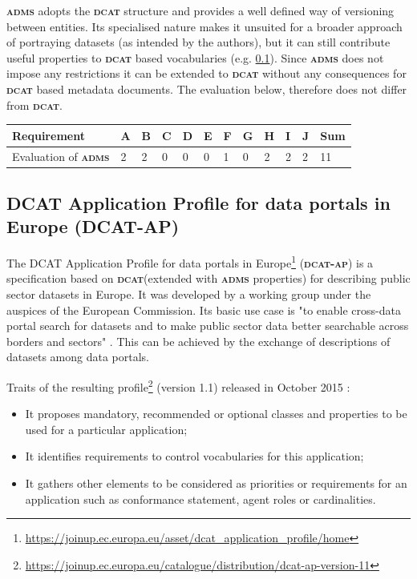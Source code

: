 \documentclass[a4paper,english,twoside,BCOR1.5cm,headsepline,DIV12,appendixprefix,final,12pt]{scrbook}
\newcommand{\dcat}{{\scshape\bfseries dcat}\xspace}
\newcommand{\dcatap}{{\scshape\bfseries dcat-ap}\xspace}
\newcommand{\adms}{{\scshape\bfseries adms}\xspace}
\newcommand\footnoteurl[1]{\footnote{\scriptsize\url{#1}}}
\begin{document}
\adms adopts the \dcat structure and provides a well defined way of versioning between entities. Its specialised nature makes it unsuited for a broader approach of portraying datasets (as intended by the authors), but it can still contribute useful properties to \dcat based vocabularies (e.g. \cref{sec:dcatap}). Since \adms does not impose any restrictions it can be extended to \dcat without any consequences for \dcat based metadata documents. The evaluation below, therefore does not differ from \dcat.

\begin{table}[!htbp]
    \centering
    \begin{tabular}{|l|l|l|l|l|l|l|l|l|l|l|l|}
        \hline
        Requirement & A & B & C & D & E & F & G & H & I & J & Sum \\
        \hline
        Evaluation of \adms & 2 & 2 & 0 & 0 & 0 & 1 & 0 & 2 & 2 & 2 & 11 \\
        \hline
    \end{tabular}
    \label{tab:evaladms}
\end{table}

\subsection{DCAT Application Profile for data portals in Europe (DCAT-AP)}
\label{sec:dcatap}

The DCAT Application Profile for data portals in Europe\footnoteurl{https://joinup.ec.europa.eu/asset/dcat_application_profile/home} (\dcatap) is a specification based on \dcat (extended with \adms properties) for describing public sector datasets in Europe. It was developed by a working group under the auspices of the European Commission. Its basic use case is "to enable cross-data portal search for datasets and to make public sector data better searchable across borders and sectors" \cite{dcatap11}. This can be achieved by the exchange of descriptions of datasets among data portals.

Traits of the resulting profile\footnoteurl{https://joinup.ec.europa.eu/catalogue/distribution/dcat-ap-version-11} (version 1.1) released in October 2015 \cite{dekkersDcatApW3C2016}:

\begin{itemize}
\item It proposes mandatory, recommended or optional classes and properties to be used for a particular
application;
\item It identifies requirements to control vocabularies for this application;
\item It gathers other elements to be considered as priorities or requirements for an application such as
conformance statement, agent roles or cardinalities.
\end{itemize}
\end{document}
